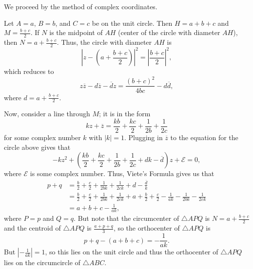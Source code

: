We proceed by the method of complex coordinates.

Let $A=a$, $B=b$, and $C=c$ be on the unit circle. Then $H=a+b+c$ and $M=\frac{b+c}{2}$. If $N$ is the midpoint of $AH$ (center of the circle with diameter $AH$), then $N=a+\frac{b+c}{2}$. Thus, the circle with diameter $AH$ is \[\left|z-\left(a+\frac{b+c}{2}\right)\right|^2=\left|\frac{b+c}{2}\right|^2,\] which reduces to \[z\overline{z}-d\overline{z}-\overline{d}z=\frac{\left(b+c\right)^2}{4bc}-d\overline{d},\] where $d=a+\frac{b+c}{2}$.

Now, consider a line through $M$; it is in the form \[kz+\overline{z}=\frac{kb}{2}+\frac{kc}{2}+\frac{1}{2b}+\frac{1}{2c}\] for some complex number $k$ with $\left|k\right|=1$. Plugging in $\overline{z}$ to the equation for the circle above gives that \[-kz^2+\left(\frac{kb}{2}+\frac{kc}{2}+\frac{1}{2b}+\frac{1}{2c}+dk-\overline{d}\right)z+\mathcal{E}=0,\] where $\mathcal{E}$ is some complex number. Thus, Viete's Formula gives us that \begin{align*}p+q&=\frac{b}{2}+\frac{c}{2}+\frac{1}{2bk}+\frac{1}{2ck}+d-\frac{\overline{d}}{k}\\&=\frac{b}{2}+\frac{c}{2}+\frac{1}{2bk}+\frac{1}{2ck}+a+\frac{b}{2}+\frac{c}{2}-\frac{1}{ak}-\frac{1}{2bk}-\frac{1}{2ck}\\&=a+b+c-\frac{1}{ak},\end{align*} where $P=p$ and $Q=q$. But note that the circumcenter of $\triangle{APQ}$ is $N=a+\frac{b+c}{2}$ and the centroid of $\triangle{APQ}$ is $\frac{a+p+q}{3}$, so the orthocenter of $\triangle{APQ}$ is \[p+q-\left(a+b+c\right)=-\frac{1}{ak}.\] But $\left|-\frac{1}{ak}\right|=1$, so this lies on the unit circle and thus the orthocenter of $\triangle{APQ}$ lies on the circumcircle of $\triangle{ABC}$.